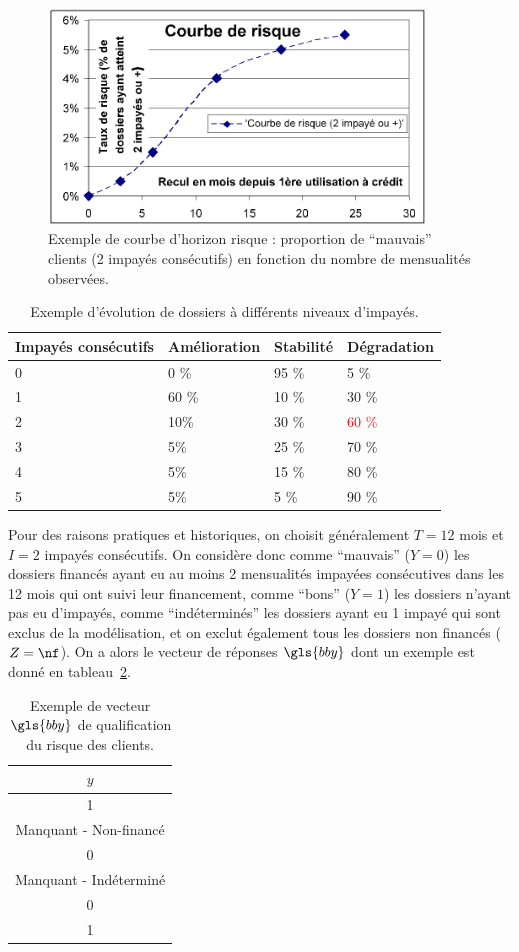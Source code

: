 \begin{figure}
\centering
\includegraphics[width=10cm]{figures/chapitre1/courbe_risque2.png}
\caption{\label{fig:courbe_horizon} Exemple de courbe d'horizon risque : proportion de ``mauvais'' clients (2 impayés consécutifs) en fonction du nombre de mensualités observées.}
\end{figure}

\begin{table}
\centering
\caption{\label{tab:impayes} Exemple d'évolution de dossiers à différents niveaux d'impayés.} 
\begin{tabular}{l|l|l|l}
Impayés consécutifs & Amélioration & Stabilité & Dégradation \\
\hline
0 & 0 \% & 95 \% & 5 \%  \\
1 & 60 \% & 10 \% & 30 \%  \\
2 & 10\% & 30 \% & \textcolor{red}{60 \%} \\
3 & 5\% & 25 \% & {70 \%} \\
4 & 5\% & 15 \% & {80 \%} \\
5 & 5\% & 5 \% & {90 \%} \\
\end{tabular}
\end{table}

Pour des raisons pratiques et historiques, on choisit généralement $T=12$ mois et $I = 2$ impayés consécutifs. On considère donc comme ``mauvais'' ($Y=0$) les dossiers financés ayant eu au moins 2 mensualités impayées consécutives dans les 12 mois qui ont suivi leur financement, comme ``bons'' ($Y=1$) les dossiers n'ayant pas eu d'impayés, comme ``indéterminés'' les dossiers ayant eu 1 impayé qui sont exclus de la modélisation, et on exclut également tous les dossiers non financés ($Z=\nf$). On a alors le vecteur de réponses $\gls{bby}$ dont un exemple est donné en tableau~\ref{tab:rep_ex}.

\begin{table}
\centering
\caption{\label{tab:rep_ex} Exemple de vecteur $\gls{bby}$ de qualification du risque des clients.}
\begin{tabular}{|c|}
\hline
$y$ \\
\hline
1 \\
Manquant - Non-financé \\
0 \\
Manquant - Indéterminé \\
0 \\
1 \\
\hline
\end{tabular}
\end{table}

